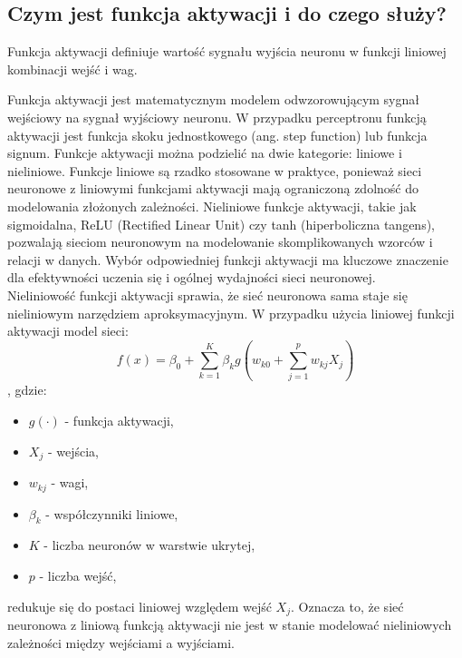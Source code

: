 \subsection{Czym jest funkcja aktywacji i do czego służy?}
Funkcja aktywacji definiuje wartość sygnału wyjścia neuronu w funkcji liniowej kombinacji wejść i wag.

Funkcja aktywacji jest matematycznym modelem odwzorowującym sygnał wejściowy na sygnał wyjściowy neuronu. W przypadku perceptronu funkcją aktywacji jest funkcja skoku jednostkowego (ang. step function) lub funkcja signum. Funkcje aktywacji można podzielić na dwie kategorie: liniowe i nieliniowe. Funkcje liniowe są rzadko stosowane w praktyce, ponieważ sieci neuronowe z liniowymi funkcjami aktywacji mają ograniczoną zdolność do modelowania złożonych zależności. Nieliniowe funkcje aktywacji, takie jak sigmoidalna, ReLU (Rectified Linear Unit) czy tanh (hiperboliczna tangens), pozwalają sieciom neuronowym na modelowanie skomplikowanych wzorców i relacji w danych. Wybór odpowiedniej funkcji aktywacji ma kluczowe znaczenie dla efektywności uczenia się i ogólnej wydajności sieci neuronowej.\\

Nieliniowość funkcji aktywacji sprawia, że sieć neuronowa sama staje się nieliniowym narzędziem aproksymacyjnym. W przypadku użycia liniowej funkcji aktywacji model sieci: 
\[f(x)= \beta_0 +\sum_{k=1}^{K}{\beta_k g(w_{k0}+\sum_{j=1}^{p}{w_{kj}X_j})}\],
gdzie: 
\begin{itemize}
    \item $g(\cdot)$ - funkcja aktywacji,
    \item $X_j$ - wejścia,
    \item $w_{kj}$ - wagi,
    \item $\beta_k$ - współczynniki liniowe,
    \item $K$ - liczba neuronów w warstwie ukrytej,
    \item $p$ - liczba wejść,
\end{itemize}
redukuje się do postaci liniowej względem wejść $X_j$. Oznacza to, że sieć neuronowa z liniową funkcją aktywacji nie jest w stanie modelować nieliniowych zależności między wejściami a wyjściami.\cite{islp}

